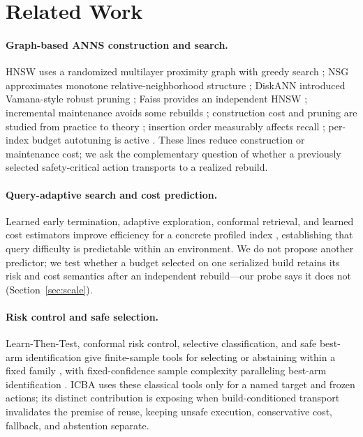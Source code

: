 \documentclass{article}
\begin{document}
\section{Related Work}
\label{sec:related}

\paragraph{Graph-based ANNS construction and search.}
HNSW uses a randomized multilayer proximity graph with greedy search \citep{malkov2020hnsw}; NSG
approximates monotone relative-neighborhood structure \citep{fu2019nsg}; DiskANN introduced Vamana-style
robust pruning \citep{subramanya2019diskann}; Faiss provides an independent HNSW \citep{johnson2021faiss};
incremental maintenance avoids some rebuilds \citep{xu2022maintenance}; construction cost and pruning are
studied from practice to theory \citep{prokhorenkova2020graph}; insertion order measurably affects recall
\citep{elliott2024order}; per-index budget autotuning is active \citep{bae2026qbat}. These lines reduce
construction or maintenance cost; we ask the complementary question of whether a previously selected
safety-critical action transports to a realized rebuild.

\paragraph{Query-adaptive search and cost prediction.}
Learned early termination, adaptive exploration, conformal retrieval, and learned cost estimators improve
efficiency for a concrete profiled index
\citep{li2020learned,chatzakis2025darth,horchidan2025conann,wang2026annie,zhang2026exploration},
establishing that query difficulty is predictable within an environment. We do not propose another
predictor; we test whether a budget selected on one serialized build retains its risk and cost semantics
after an independent rebuild---our probe says it does not (Section~\ref{sec:scale}).

\paragraph{Risk control and safe selection.}
Learn-Then-Test, conformal risk control, selective classification, and safe best-arm identification give
finite-sample tools for selecting or abstaining within a fixed family
\citep{angelopoulos2025ltt,bates2021rcps,angelopoulos2024crc,elyaniv2010selective,wang2022safebai}, with
fixed-confidence sample complexity paralleling best-arm identification \citep{garivier2016bai}. ICBA uses
these classical tools only for a named target and frozen actions; its distinct contribution is exposing
when build-conditioned transport invalidates the premise of reuse, keeping unsafe execution, conservative
cost, fallback, and abstention separate.
\end{document}
